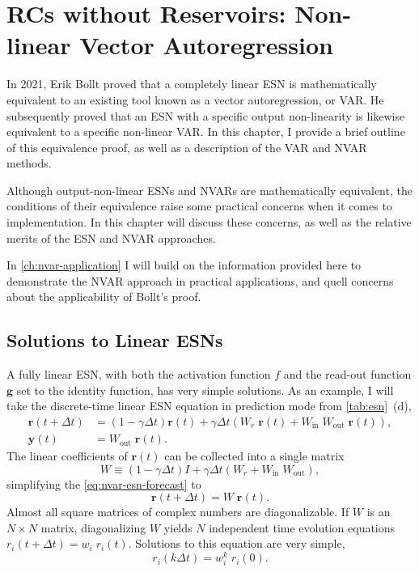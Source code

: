 \chapter{RCs without Reservoirs: Non-linear Vector Autoregression}\label{ch:nvar}

In 2021, Erik Bollt proved\cite{bollt2021} that a completely linear
ESN is mathematically equivalent to an existing tool known as a vector
autoregression, or VAR. He subsequently proved that an ESN with a
specific output non-linearity is likewise equivalent to a specific
non-linear VAR. In this chapter, I provide a brief outline of this
equivalence proof, as well as a description of the VAR and NVAR
methods.

Although output-non-linear ESNs and NVARs are mathematically
equivalent, the conditions of their equivalence raise some practical
concerns when it comes to implementation. In this chapter will discuss
these concerns, as well as the relative merits of the ESN and NVAR
approaches.

In \cref{ch:nvar-application} I will build on the information provided
here to demonstrate the NVAR approach in practical applications, and
quell concerns about the applicability of Bollt's proof.

\section{Solutions to Linear ESNs}

A fully linear ESN, with both the activation function $f$ and the
read-out function $\bm{g}$ set to the identity function, has very
simple solutions. As an example, I will take the discrete-time linear
ESN equation in prediction mode from \cref{tab:esn}~(d),
\begin{align}
  \bm{r}(t + \Delta t) &= (1 - \gamma \Delta t) \bm{r}(t) + \gamma \Delta t \left( W_r\;\bm{r}(t) + W_\text{in}\;W_\text{out}\;\bm{r}(t)\right), \label{eq:nvar-esn-forecast} \\
  \bm{y}(t) &= W_\text{out}\;\bm{r}(t).
\end{align}
The linear coefficients of $\bm{r}(t)$ can be collected into a single matrix
\begin{equation}
  W \equiv (1 - \gamma \Delta t) I + \gamma \Delta t \left( W_r + W_\text{in}\;W_\text{out}\right),
\end{equation}
simplifying the \cref{eq:nvar-esn-forecast} to
\begin{equation}
  \bm{r}(t + \Delta t) = W\;\bm{r}(t).
\end{equation}
Almost all square matrices of complex numbers are diagonalizable. If
$W$ is an $N \times N$ matrix, diagonalizing $W$ yields $N$
independent time evolution equations $r_i(t + \Delta t) = w_i\;
r_i(t)$. Solutions to this equation are very simple,
\begin{equation}
  r_i(k \Delta t) = w_i^k\; r_i(0).
\end{equation}

